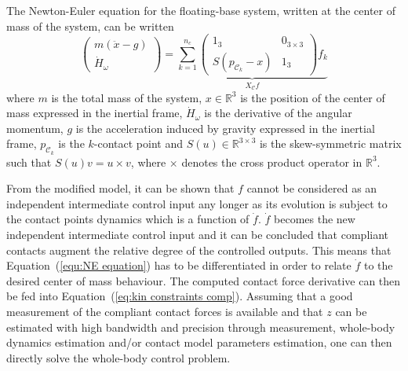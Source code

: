 The Newton-Euler equation for the floating-base system, written at the center of mass of the system, can be written
\begin{equation}
\label{equ:NE equation}
\left( \begin{array}{c}
m (\ddot{x}-g)\\ 
\dot{H}_{\omega}
\end{array}\right) =
\underbrace{\sum_{k=1}^{n_c} \left(\begin{array}{cc}
1_{3} & 0_{3\times 3} \\
S(p_{\mathcal{C}_k} - x) & 1_{3}
\end{array}\right)  f_k}_{X_{\mathcal{C}} f}
\end{equation}
where $m$ is the total mass of the system, $x \in \mathbb{R}^3$ is the position of the center of mass expressed in the inertial frame, $\dot{H}_{\omega}$ is the derivative of the angular momentum, $g$ is the acceleration induced by gravity expressed in the inertial frame, $p_{\mathcal{C}_k}$ is the $k$-contact point and $S(u) \in \mathbb{R}^{3\times 3}$ is the skew-symmetric matrix such that $S(u)v = u \times v$, where $\times$ denotes the cross product operator in $\mathbb{R}^3$.
 
From the modified model, it can be shown that $f$ cannot be considered as an independent intermediate control input any longer as its evolution is subject to the contact points dynamics which is a function of $\dot{f}$. $\dot{f}$ becomes the new independent intermediate control input and it can be concluded that compliant contacts augment the relative degree of the controlled outputs. This means that Equation~(\ref{equ:NE equation}) has to be differentiated in order to relate $\dot{f}$ to the desired center of mass behaviour. The computed contact force derivative can then be fed into Equation~(\ref{eq:kin constraints comp}). Assuming that a good measurement of the compliant contact forces is available and that $z$ can be estimated with high bandwidth and precision through measurement, whole-body dynamics estimation and/or contact model parameters estimation, one can then directly solve the whole-body control problem.\\

